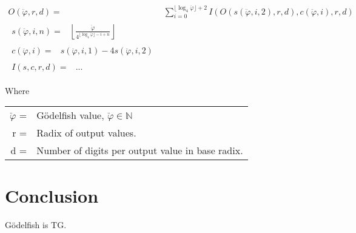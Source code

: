 \documentclass{article}
\begin{document}
\begin{align}
	O(\ddot{\varphi}, r, d) ={}& \sum_{i=0}^{\lfloor \log_4 \ddot{\varphi} \rfloor + 2} I(O(s(\ddot{\varphi}, i, 2), r, d), c(\ddot{\varphi}, i), r, d) \\
\begin{split}
	s(\ddot{\varphi}, i, n) ={}& \left\lfloor \frac{\ddot{\varphi}}{4^{\lfloor \log_4 \ddot{\varphi} \rfloor - i + n}} \right\rfloor
\end{split} \\
\begin{split}
	c(\ddot{\varphi}, i) ={}& s(\ddot{\varphi}, i, 1) - 4s(\ddot{\varphi}, i, 2)
\end{split} \\
\begin{split}
	I(s, c, r, d) ={}& ...
\end{split}
\end{align}

Where
\begin{tabular}{rl}
	$\ddot{\varphi}$ =& Gödelfish value, $\ddot{\varphi} \in \mathbb{N}$ \\
	r =& Radix of output values. \\
	d =& Number of digits per output value in base radix.
\end{tabular}


\section{Conclusion}
Gödelfish is TG.
\end{document}
